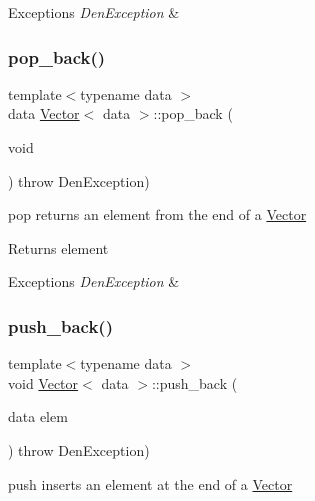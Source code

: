 \begin{DoxyExceptions}{Exceptions}
{\em Den\+Exception} & \\
\hline
\end{DoxyExceptions}
\mbox{\label{classVector_af58fb997ed40663eb1e9f17b96cbc846}} 
\subsubsection{\texorpdfstring{pop\+\_\+back()}{pop\_back()}}
{\footnotesize\ttfamily template$<$typename data $>$ \\
data \hyperlink{classVector}{Vector}$<$ data $>$\+::pop\+\_\+back (\begin{DoxyParamCaption}\item[{void}]{ }\end{DoxyParamCaption}) throw  Den\+Exception) }



pop  returns an element from the end of a \hyperlink{classVector}{Vector} 

\begin{DoxyReturn}{Returns}
element 
\end{DoxyReturn}

\begin{DoxyExceptions}{Exceptions}
{\em Den\+Exception} & \\
\hline
\end{DoxyExceptions}
\mbox{\label{classVector_a8e34f2f9943752507540bc80dba453fd}} 
\subsubsection{\texorpdfstring{push\+\_\+back()}{push\_back()}}
{\footnotesize\ttfamily template$<$typename data $>$ \\
void \hyperlink{classVector}{Vector}$<$ data $>$\+::push\+\_\+back (\begin{DoxyParamCaption}\item[{data}]{elem }\end{DoxyParamCaption}) throw  Den\+Exception) }



push  inserts an element at the end of a \hyperlink{classVector}{Vector} 


